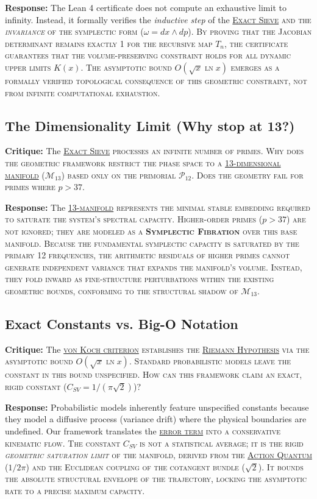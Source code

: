 \documentclass[sn-mathphys-num, pdflatex, referee]{sn-jnl}
\newcommand{\gterm}[2]{\begingroup\normalfont\scshape\hyperlink{#1}{#2}\endgroup}
\begin{document}
\textbf{Response:} The Lean 4 certificate does not compute an exhaustive limit to infinity. Instead, it formally verifies the \textit{inductive step} of the \gterm{exact_sieve}{Exact Sieve} and the \textit{invariance} of the symplectic form ($\omega = dx \wedge dp$). By proving that the Jacobian determinant remains exactly 1 for the recursive map $T_n$, the certificate guarantees that the volume-preserving constraint holds for all dynamic upper limits $K(x)$. The asymptotic bound $O(\sqrt{x} \ln x)$ emerges as a formally verified topological consequence of this geometric constraint, not from infinite computational exhaustion.

\subsection*{The Dimensionality Limit (Why stop at 13?)}
\textbf{Critique:} The \gterm{exact_sieve}{Exact Sieve} processes an infinite number of primes. Why does the geometric framework restrict the phase space to a \gterm{m13}{13-dimensional manifold} ($\mathcal{M}_{13}$) based only on the primorial $\mathcal{P}_{12}$. Does the geometry fail for primes where $p > 37$.

\textbf{Response:} The \gterm{m13}{13-manifold} represents the minimal stable embedding required to saturate the system's spectral capacity. Higher-order primes ($p > 37$) are not ignored; they are modeled as a \textbf{Symplectic Fibration} over this base manifold. Because the fundamental symplectic capacity is saturated by the primary 12 frequencies, the arithmetic residuals of higher primes cannot generate independent variance that expands the manifold's volume. Instead, they fold inward as fine-structure perturbations within the existing geometric bounds, conforming to the structural shadow of \gterm{m13}{$\mathcal{M}_{13}$}.

\subsection*{Exact Constants vs. Big-O Notation}
\textbf{Critique:} The \gterm{von_koch}{von Koch criterion} establishes the \gterm{rh}{Riemann Hypothesis} via the asymptotic bound $O(\sqrt{x} \ln x)$. Standard probabilistic models leave the constant in this bound unspecified. How can this framework claim an exact, rigid constant (\gterm{csv}{$C_{SV} = 1/(\pi\sqrt{2})$})?

\textbf{Response:} Probabilistic models inherently feature unspecified constants because they model a diffusive process (variance drift) where the physical boundaries are undefined. Our framework translates the \gterm{error_term}{error term} into a conservative kinematic flow. The constant \gterm{csv}{$C_{SV}$} is not a statistical average; it is the rigid \textit{geometric saturation limit} of the manifold, derived from the \gterm{action_quantum}{Action Quantum} ($1/2\pi$) and the Euclidean coupling of the cotangent bundle ($\sqrt{2}$). It bounds the absolute structural envelope of the trajectory, locking the asymptotic rate to a precise maximum capacity.
\end{document}
